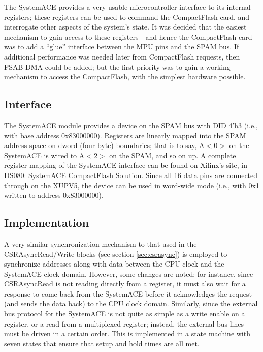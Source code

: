 \documentclass[10pt]{article}
\begin{document}
The SystemACE provides a very usable microcontroller interface to its
internal registers; these registers can be used to command the CompactFlash
card, and interrogate other aspects of the system's state. It was decided
that the easiest mechanism to gain access to these registers - and hence the
CompactFlash card - was to add a ``glue'' interface between the MPU pins and
the SPAM bus. If additional performance was needed later from CompactFlash
requests, then FSAB DMA could be added; but the first priority was to gain a
working mechanism to access the CompactFlash, with the simplest hardware
possible.

\subsection{Interface}

The SystemACE module provides a device on the SPAM bus with DID 4'h3 (i.e.,
with base address 0x83000000). Registers are linearly mapped into the SPAM
address space on dword (four-byte) boundaries; that is to say, A$<0>$ on the
SystemACE is wired to A$<2>$ on the SPAM, and so on up. A complete register
mapping of the SystemACE interface can be found on Xilinx's site, in
\href{http://www.xilinx.com/support/documentation/data_sheets/ds080.pdf}{DS080:
SystemACE CompactFlash Solution}. Since all 16 data pins are connected
through on the XUPV5, the device can be used in word-wide mode (i.e., with
0x1 written to address 0x83000000).

\subsection{Implementation}

A very similar synchronization mechanism to that used in the
CSRAsyncRead/Write blocks (see section \ref{sec:csrasync}) is employed to
synchronize addresses along with data between the CPU clock and the
SystemACE clock domain.  However, some changes are noted; for instance,
since CSRAsyncRead is not reading directly from a register, it must also
wait for a response to come back from the SystemACE before it acknowledges
the request (and sends the data back) to the CPU clock domain.  Similarly,
since the external bus protocol for the SystemACE is not quite as simple as
a write enable on a register, or a read from a multiplexed register;
instead, the external bus lines must be driven in a certain order.  This is
implemented in a state machine with seven states that ensure that setup and
hold times are all met.
\end{document}
